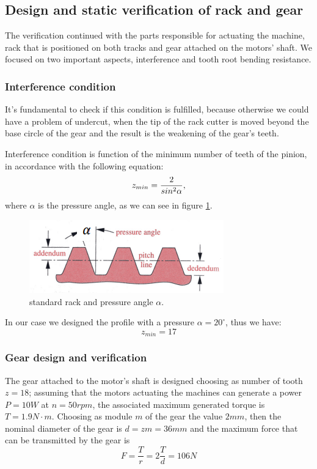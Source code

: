 \subsection{Design and static verification of rack and gear}
The verification continued with the parts responsible for actuating the machine, rack that is positioned on both tracks and gear attached on the motors' shaft.
We focused on two important aspects, interference and tooth root bending resistance.

\subsubsection*{Interference condition}
It's fundamental to check if this condition is fulfilled, because otherwise we could have a problem of undercut, when the tip of the rack cutter is moved beyond the base circle of the gear and the result is the weakening of the gear's teeth.

Interference condition is function of the minimum number of teeth of the pinion, in accordance with the following equation:
\begin{equation}
	\centering
	z_{min} = \frac{2}{sin^2\alpha},
\end{equation}
where $\alpha$ is the pressure angle, as we can see in figure \ref{fig:rack}.
\begin{figure}
	\centering
	\includegraphics[scale=1]{Images/rack.png}
	\caption{standard rack and pressure angle $\alpha$.}
	\label{fig:rack}
\end{figure}
In our case we designed the profile with a pressure $\alpha = 20^\circ$, thus we have:
\begin{equation*}
	z_{min} = 17
\end{equation*}

\subsubsection*{Gear design and verification}
	The gear attached to the motor's shaft is designed choosing as number of tooth $z=18$; assuming that the motors actuating the machines can generate a power $P=10W$ at $n = 50rpm$, the associated maximum generated torque is $T=1.9N\cdot m$. Choosing as module $m$ of the gear the value $2mm$, then the nominal diameter of the gear is $d = zm = 36mm$ and the maximum force that can be transmitted by the gear is
	\[ F = \frac T r = 2 \frac T d = 106N\]
	
